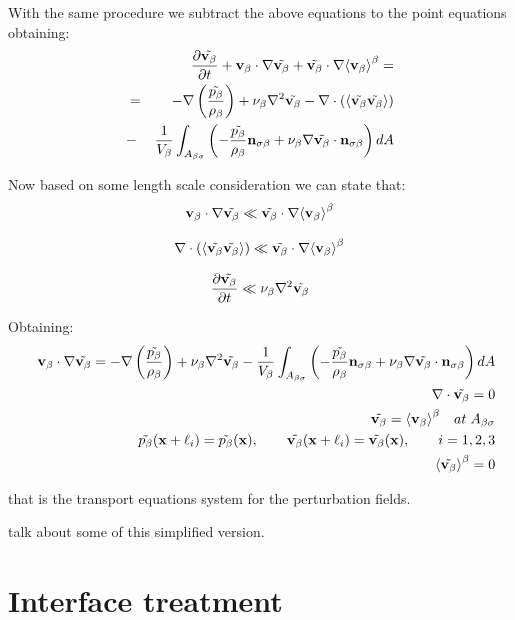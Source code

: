 With the same procedure we subtract the above equations to the point equations obtaining:
\begin{eqnarray}
& &  \frac{\partial \tilde{\textbf{v}_{\beta}}}{\partial t} + \textbf{v}_{\beta} \cdot \nabla \tilde{\textbf{v}_{\beta}} + \tilde{\textbf{v}_{\beta}} \cdot \nabla {\left< \textbf{v}_{\beta}\right>}^{\beta}  = \nonumber \\
&=& -\nabla \left(\dfrac{\tilde{p_{\beta}}}{\rho_{\beta}}\right) + \nu_{\beta} \nabla^2 \tilde{\textbf{v}_{\beta}} - \nabla \cdot \left({\left< \tilde{\textbf{v}_{\beta}} \tilde{\textbf{v}_{\beta}} \right>}\right) \nonumber \\
&-& \dfrac{1}{V_\beta} \int_{A_{\beta \sigma}} \left(-\dfrac{\tilde{p_{\beta}}}{\rho_{\beta}} \mathbf{n}_{\sigma \beta}  + \nu_{\beta} \nabla \tilde{\textbf{v}_{\beta}} \cdot \mathbf{n}_{\sigma \beta}\right) dA
\label{eq:vans_mom_3}
\end{eqnarray}

Now based on some length scale consideration we can state that:
$$ 
\textbf{v}_{\beta} \cdot \nabla \tilde{\textbf{v}_{\beta}} \ll \tilde{\textbf{v}_{\beta}} \cdot \nabla {\left< \textbf{v}_{\beta}\right>}^{\beta}
$$

$$
\nabla \cdot \left({\left< \tilde{\textbf{v}_{\beta}} \tilde{\textbf{v}_{\beta}} \right>}\right) \ll \tilde{\textbf{v}_{\beta}} \cdot \nabla {\left< \textbf{v}_{\beta}\right>}^{\beta}
$$

$$
\frac{\partial \tilde{\textbf{v}_{\beta}}}{\partial t} \ll \nu_{\beta} \nabla^2 \tilde{\textbf{v}_{\beta}}
$$

Obtaining:
\begin{eqnarray}
&& \textbf{v}_{\beta} \cdot \nabla \tilde{\textbf{v}_{\beta}} = -\nabla \left(\dfrac{\tilde{p_{\beta}}}{\rho_{\beta}}\right) + \nu_{\beta} \nabla^2 \tilde{\textbf{v}_{\beta}} - \dfrac{1}{V_\beta} \int_{A_{\beta \sigma}} \left(-\dfrac{\tilde{p_{\beta}}}{\rho_{\beta}} \mathbf{n}_{\sigma \beta}  + \nu_{\beta} \nabla \tilde{\textbf{v}_{\beta}} \cdot \mathbf{n}_{\sigma \beta}\right) dA  \\
&& \nabla \cdot \tilde{\textbf{v}_{\beta}} = 0  \\
&& \tilde{\textbf{v}_{\beta}} = {\left< \textbf{v}_{\beta} \right>}^{\beta} \quad at \; A_{\beta \sigma} \\
&& \tilde{p_{\beta}}(\mathbf{x} +\ell_i) = \tilde{p_{\beta}}(\mathbf{x}), \qquad \tilde{\textbf{v}_{\beta}}(\mathbf{x} +\ell_i) = \tilde{\textbf{v}_{\beta}}(\mathbf{x}), \qquad i=1,2,3 \\
&& {\left< \tilde{\textbf{v}_{\beta}} \right>}^{\beta} = 0
\label{eq:vans_mom_}
\end{eqnarray}

that is the transport equations system for the perturbation fields.



\citet{barrere1992closure}

\citet{kozeny} talk about some of this simplified version.
\section{Interface treatment}

